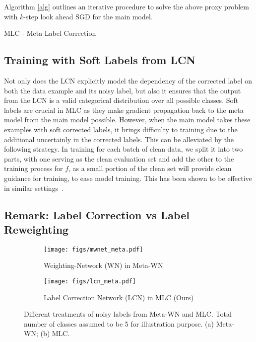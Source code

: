 Algorithm \ref{alg} outlines an iterative procedure to solve the above
proxy problem with $k$-step look ahead SGD for the main model.

\begin{algorithm}[t]
 \caption{MLC - Meta Label Correction}
 \label{alg}
\end{algorithm}



\subsection{Training with Soft Labels from LCN}

Not only does the LCN explicitly model the dependency of the corrected
label on both the data example and its noisy label, but also it
ensures that the output from the LCN is a valid categorical
distribution over all possible classes. Soft labels are crucial in MLC
as they make gradient propagation back to the meta model from the main
model possible. However, when the main model takes these examples with
soft corrected labels, it brings difficulty to training due to the
additional uncertainly in the corrected labels. This can be alleviated
by the following strategy. In training for each batch of clean data,
we split it into two parts, with one serving as the clean evaluation
set and add the other to the training process for $f$, as a small
portion of the clean set will provide clean guidance for training, to
ease model training. This has been shown to be effective in similar
settings~\cite{ranzato2015sequence, pham2020meta}. 

\subsection{Remark: Label Correction vs Label Reweighting}

\begin{figure}[t]
  \centering
  \begin{subfigure}{0.495\linewidth}
    \centering
    \texttt{[image: figs/mwnet\_meta.pdf]}
    \caption{Weighting-Network (WN) in Meta-WN~\cite{shu2019meta}}
  \end{subfigure}
  \hfill
  \begin{subfigure}{0.495\linewidth}
    \centering
    \texttt{[image: figs/lcn\_meta.pdf]}
    \caption{Label Correction Network (LCN) in MLC (Ours)}
  \end{subfigure}
  \caption{Different treatments of noisy labels from Meta-WN and
    MLC. Total number of classes assumed to be 5 for illustration
    purpose. (a) Meta-WN; (b) MLC.}
  \label{meta_ops}
  \vspace{-0.15in}
\end{figure}


